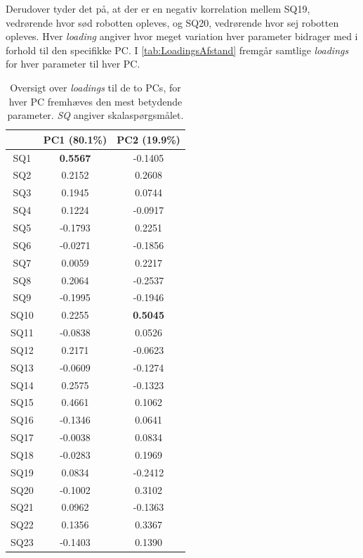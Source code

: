 Derudover tyder det på, at der er en negativ korrelation mellem SQ19, vedrørende hvor sød robotten opleves, og SQ20, vedrørende hvor sej robotten opleves.\blankline
%
Hver \textit{loading} angiver hvor meget variation hver parameter bidrager med i forhold til den specifikke PC. I \autoref{tab:LoadingsAfstand} fremgår samtlige \textit{loadings} for hver parameter til hver PC. 
%
\begin{table}[H]
\centering
\begin{tabular}{c|c|c}
    & PC1 (80.1\%)    & PC2 (19.9\%)    \\ \hline
SQ1  & \textbf{0.5567} & -0.1405         \\ \hline
SQ2  & 0.2152          & 0.2608          \\ \hline
SQ3  & 0.1945          & 0.0744          \\ \hline
SQ4  & 0.1224          & -0.0917         \\ \hline
SQ5  & -0.1793         & 0.2251          \\ \hline
SQ6  & -0.0271         & -0.1856         \\ \hline
SQ7  & 0.0059          & 0.2217          \\ \hline
SQ8  & 0.2064          & -0.2537         \\ \hline
SQ9  & -0.1995         & -0.1946         \\ \hline
SQ10 & 0.2255          & \textbf{0.5045} \\ \hline
SQ11 & -0.0838         & 0.0526          \\ \hline
SQ12 & 0.2171          & -0.0623         \\ \hline
SQ13 & -0.0609         & -0.1274         \\ \hline
SQ14 & 0.2575          & -0.1323         \\ \hline
SQ15 & 0.4661          & 0.1062          \\ \hline
SQ16 & -0.1346         & 0.0641          \\ \hline
SQ17 & -0.0038         & 0.0834          \\ \hline
SQ18 & -0.0283         & 0.1969          \\ \hline
SQ19 & 0.0834          & -0.2412         \\ \hline
SQ20 & -0.1002         & 0.3102          \\ \hline
SQ21 & 0.0962          & -0.1363         \\ \hline
SQ22 & 0.1356          & 0.3367          \\ \hline
SQ23 & -0.1403         & 0.1390         
\end{tabular}
\caption{Oversigt over \textit{loadings} til de to PCs, for hver PC fremhæves den mest betydende parameter. \textit{SQ} angiver skalaspørgsmålet.}
\label{tab:LoadingsAfstand}
\end{table}
\noindent
%

